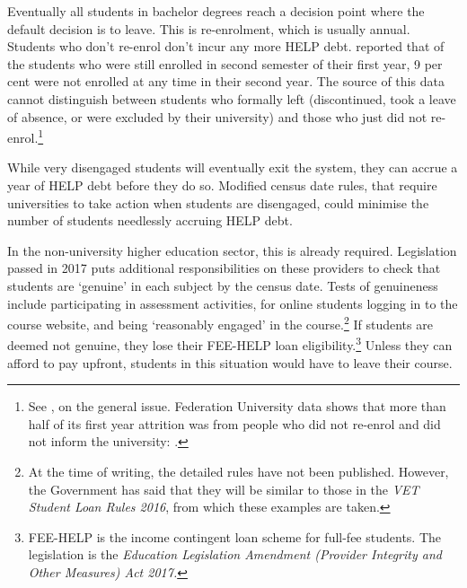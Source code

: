 Eventually all students in bachelor degrees reach a decision point where the default decision is to leave. This is re-enrolment, which is usually annual. Students who don't re-enrol don't incur any more HELP debt.  reported that of the students who were still enrolled in second semester of their first year, 9 per cent were not enrolled at any time in their second year. The source of this data cannot distinguish between students who formally left (discontinued, took a leave of absence, or were excluded by their university) and those who just did not re-enrol.\footnote{See \textcite[][20--21]{Harvey2017a}, on the general issue. Federation University data shows that more than half of its first year attrition was from people who did not re-enrol and did not inform the university: \textcite[][]{FederationUniversity2018}.}

While very disengaged students will eventually exit the system, they can accrue a year of HELP debt before they do so. Modified census date rules, that require universities to take action when students are disengaged, could minimise the number of students needlessly accruing HELP debt.

In the non-university higher education sector, this is already required. Legislation passed in 2017 puts additional responsibilities on these providers to check that students are `genuine' in each subject by the census date. Tests of genuineness include participating in assessment activities, for online students logging in to the course website, and being `reasonably engaged' in the course.\footnote{At the time of writing, the detailed rules have not been published. However, the Government has said that they will be similar to those in the \emph{VET Student Loan Rules 2016}, from which these examples are taken.} 
If students are deemed not genuine, they lose their FEE-HELP loan eligibility.\footnote{FEE-HELP is the income contingent loan scheme for full-fee students. The legislation is the \emph{Education Legislation Amendment (Provider Integrity and Other Measures) Act 2017.}} Unless they can afford to pay upfront, students in this situation would have to leave their course.

